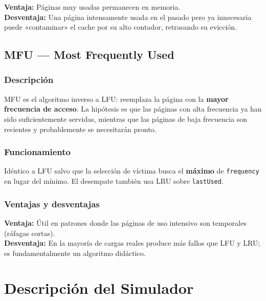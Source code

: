 \documentclass[12pt, a4paper]{article}
\begin{document}
\begin{infobox}[title={LFU}]
\textbf{Ventaja:} Páginas muy usadas permanecen en memoria. \\
\textbf{Desventaja:} Una página intensamente usada en el pasado pero ya innecesaria puede «contaminar» el cache por su alto contador, retrasando su evicción.
\end{infobox}

\subsection{MFU — Most Frequently Used}

\subsubsection{Descripción}

MFU es el algoritmo inverso a LFU: reemplaza la página con la \textbf{mayor frecuencia de acceso}. La hipótesis es que las páginas con alta frecuencia ya han sido suficientemente servidas, mientras que las páginas de baja frecuencia son recientes y probablemente se necesitarán pronto.

\subsubsection{Funcionamiento}

Idéntico a LFU salvo que la selección de víctima busca el \textbf{máximo} de \texttt{frequency} en lugar del mínimo. El desempate también usa LRU sobre \texttt{lastUsed}.

\subsubsection{Ventajas y desventajas}

\begin{infobox}[title={MFU}]
\textbf{Ventaja:} Útil en patrones donde las páginas de uso intensivo son temporales (ráfagas cortas). \\
\textbf{Desventaja:} En la mayoría de cargas reales produce más fallos que LFU y LRU; es fundamentalmente un algoritmo didáctico.
\end{infobox}

\section{Descripción del Simulador}
\end{document}
